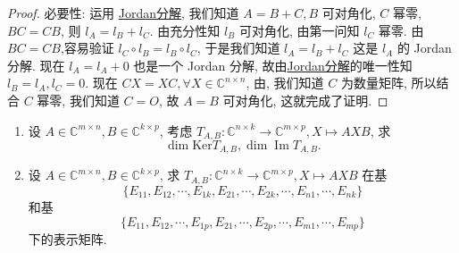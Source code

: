 \documentclass[../../main.tex]{subfiles}%
\begin{document}
\begin{proof}
{\heiti 必要性: }运用 \hyperref[theorem:Jordan-Chevalley分解]{Jordan分解}, 我们知道 $A = B + C, B$ 可对角化, $C$ 幂零, $BC = CB$, 则 $l_A = l_B + l_C$. 由充分性知 $l_B$ 可对角化, 由第一问知 $l_C$ 幂零. 由$BC=CB$,容易验证 $l_C \circ  l_B = l_B \circ  l_C$, 于是我们知道 $l_A = l_B + l_C$ 这是 $l_A$ 的 Jordan 分解. 现在 $l_A = l_A + 0$ 也是一个 Jordan 分解, 故由\hyperref[theorem:Jordan-Chevalley分解]{Jordan分解}的唯一性知$l_B = l_A, l_C = 0$. 现在 $CX = XC, \forall X \in \mathbb{C}^{n \times n}$, 由, 我们知道 $C$ 为数量矩阵, 所以结合 $C$ 幂零, 我们知道 $C = O$, 故 $A = B$ 可对角化, 这就完成了证明.

\end{proof}

\begin{example}
\begin{enumerate}
\item 设 $A \in \mathbb{C}^{m \times n}, B \in \mathbb{C}^{k \times p}$, 考虑 $T_{A,B} : \mathbb{C}^{n \times k} \to \mathbb{C}^{m \times p}, X \mapsto AXB$, 求
$$\dim \mathrm{Ker} T_{A,B}, \dim \operatorname{Im} T_{A,B}.$$

\item 设 $A \in \mathbb{C}^{m \times n}, B \in \mathbb{C}^{k \times p}$, 求 $T_{A,B} : \mathbb{C}^{n \times k} \to \mathbb{C}^{m \times p}, X \mapsto AXB$ 在基
$$\{E_{11}, E_{12}, \cdots, E_{1k}, E_{21}, \cdots, E_{2k}, \cdots, E_{n1}, \cdots, E_{nk}\}$$
和基
$$\{E_{11}, E_{12}, \cdots, E_{1p}, E_{21}, \cdots, E_{2p}, \cdots, E_{m1}, \cdots, E_{mp}\}$$
下的表示矩阵.
\end{enumerate}
\end{example}
\end{document}
